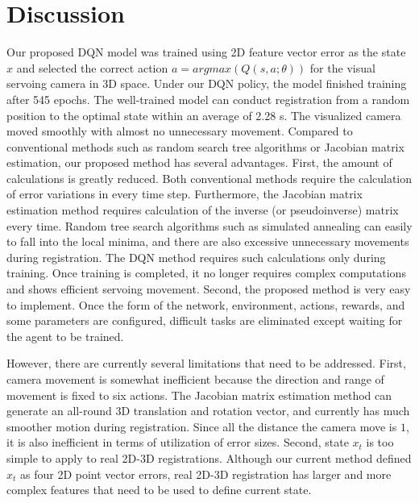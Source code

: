 \documentclass[10pt]{article}
\begin{document}
\section{Discussion}
 Our proposed DQN model was trained using 2D feature vector error as the state $x$ and selected the correct action $a = argmax(Q(s,a;\theta))$ for the visual servoing camera in 3D space. Under our DQN policy, the model finished training after 545 epochs. The well-trained model can conduct registration from a random position to the optimal state within an average of 2.28 s. The visualized camera moved smoothly with almost no unnecessary movement. Compared to conventional methods such as random search tree algorithms or Jacobian matrix estimation, our proposed method has several advantages. First, the amount of calculations is greatly reduced. Both conventional methods require the calculation of error variations in every time step. Furthermore, the Jacobian matrix estimation method requires calculation of the inverse (or pseudoinverse) matrix every time. Random tree search algorithms such as simulated annealing can easily to fall into the local minima, and there are also excessive unnecessary movements during registration. The DQN method requires such calculations only during training. Once training is completed, it no longer requires complex computations and shows efficient servoing movement. Second, the proposed method is very easy to implement. Once the form of the network, environment, actions, rewards, and some parameters are configured, difficult tasks are eliminated except waiting for the agent to be trained.

 However, there are currently several limitations that need to be addressed. First, camera movement is somewhat inefficient because the direction and range of movement is fixed to six actions. The Jacobian matrix estimation method can generate an all-round 3D translation and rotation vector, and currently has much smoother motion during registration. Since all the distance the camera move is $1$, it is also inefficient in terms of utilization of error sizes. Second, state $x_t$ is too simple to apply to real 2D-3D registrations. Although our current method defined $x_t$ as four 2D point vector errors, real 2D-3D registration has larger and more complex features that need to be used to define current state.
\end{document}
